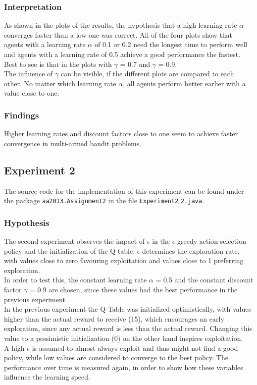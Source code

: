 \documentclass[11pt]{article}
\begin{document}
\subsubsection{Interpretation}
As shown in the plots of the results, the hypothesis that a high learning rate $\alpha$ converges faster than a low one was correct. All of the four plots show that agents with a learning rate $\alpha$ of 0.1 or 0.2 need the longest time to perform well and agents with a learning rate of 0.5 achieve a good performance the fastest. Best to see is that in the plots with $\gamma$ = 0.7 and $\gamma$ = 0.9.\\
The influence of $\gamma$ can be visible, if the different plots are compared to each other. No matter which learning rate $\alpha$, all agents perform better earlier with a value close to one.

\subsubsection{Findings}
Higher learning rates and discount factors close to one seem to achieve faster convergence in multi-armed bandit problems.


\subsection{Experiment 2}
The source code for the implementation of this experiment can be found under the package \texttt{aa2013.Assignment2} in the file \texttt{Experiment2$\_$2.java}.
\subsubsection{Hypothesis}
The second experiment observes the impact of $\epsilon$ in the $\epsilon$-greedy action selection policy and the initialization of the Q-table. $\epsilon$ determines the exploration rate, with values close to zero favouring exploitation and values close to 1 preferring exploration.\\
In order to test this, the constant learning rate $\alpha$ = 0.5 and the constant discount factor $\gamma$ = 0.9 are chosen, since these values had the best performance in the previous experiment.\\
In the previous experiment the Q-Table was initialized optimistically, with values higher than the actual reward to receive (15), which encourages an early exploration, since any actual reward is less than the actual reward. Changing this value to a pessimistic initialization (0) on the other hand inspires exploitation.\\
A high $\epsilon$ is assumed to almost always exploit and thus might not find a good policy, while low values are considered to converge to the best policy.
The performance over time is measured again, in order to show how these variables influence the learning speed.
\end{document}
